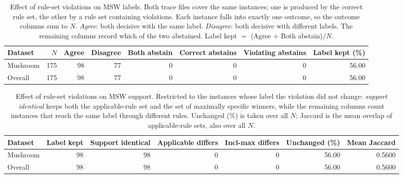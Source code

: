 \begin{table}[t]
\centering
\caption{Effect of rule-set violations on MSW labels. Both trace files cover the same instances; one is produced by the correct rule set, the other by a rule set containing violations. Each instance falls into exactly one outcome, so the outcome columns sum to $N$. \emph{Agree}: both decisive with the same label. \emph{Disagree}: both decisive with different labels. The remaining columns record which of the two abstained. Label kept $=$ (Agree $+$ Both abstain)$/N$.}
\label{tab:violation-labels}
\begin{tabular}{lrrrrrrr}
\toprule
Dataset & $N$ & Agree & Disagree & Both abstain & Correct abstains & Violating abstains & Label kept (\%) \\
\midrule
Mushroom & 175 & 98 & 77 & 0 & 0 & 0 & 56.00 \\
\midrule
Overall & 175 & 98 & 77 & 0 & 0 & 0 & 56.00 \\
\bottomrule
\end{tabular}
\end{table}

\begin{table}[t]
\centering
\caption{Effect of rule-set violations on MSW support. Restricted to the instances whose label the violation did not change: \emph{support identical} keeps both the applicable-rule set and the set of maximally specific winners, while the remaining columns count instances that reach the same label through different rules. Unchanged (\%) is taken over all $N$; Jaccard is the mean overlap of applicable-rule sets, also over all $N$.}
\label{tab:violation-support}
\begin{tabular}{lrrrrrr}
\toprule
Dataset & Label kept & Support identical & Applicable differs & Incl-max differs & Unchanged (\%) & Mean Jaccard \\
\midrule
Mushroom & 98 & 98 & 0 & 0 & 56.00 & 0.5600 \\
\midrule
Overall & 98 & 98 & 0 & 0 & 56.00 & 0.5600 \\
\bottomrule
\end{tabular}
\end{table}
